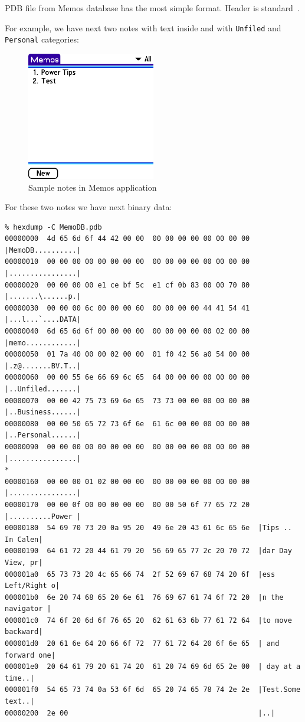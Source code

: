 \documentclass[a4paper,12pt,oneside]{scrartcl}
\begin{document}
PDB file from Memos database has the most simple format. Header is
standard~\cite{PalmFileFormatSpec}.

For example, we have next two notes with text inside and with \texttt{Unfiled}
and \texttt{Personal} categories:
\begin{figure}[H]
  \centering
  \includegraphics[width=0.5\textwidth]{memo.png}
  \caption{Sample notes in Memos application}
  \label{fig:sample-memos}
\end{figure}

For these two notes we have next binary data:

\footnotesize
\begin{verbatim}
% hexdump -C MemoDB.pdb
00000000  4d 65 6d 6f 44 42 00 00  00 00 00 00 00 00 00 00  |MemoDB..........|
00000010  00 00 00 00 00 00 00 00  00 00 00 00 00 00 00 00  |................|
00000020  00 00 00 00 e1 ce bf 5c  e1 cf 0b 83 00 00 70 80  |.......\......p.|
00000030  00 00 00 6c 00 00 00 60  00 00 00 00 44 41 54 41  |...l...`....DATA|
00000040  6d 65 6d 6f 00 00 00 00  00 00 00 00 00 02 00 00  |memo............|
00000050  01 7a 40 00 00 02 00 00  01 f0 42 56 a0 54 00 00  |.z@.......BV.T..|
00000060  00 00 55 6e 66 69 6c 65  64 00 00 00 00 00 00 00  |..Unfiled.......|
00000070  00 00 42 75 73 69 6e 65  73 73 00 00 00 00 00 00  |..Business......|
00000080  00 00 50 65 72 73 6f 6e  61 6c 00 00 00 00 00 00  |..Personal......|
00000090  00 00 00 00 00 00 00 00  00 00 00 00 00 00 00 00  |................|
*
00000160  00 00 00 01 02 00 00 00  00 00 00 00 00 00 00 00  |................|
00000170  00 00 0f 00 00 00 00 00  00 00 50 6f 77 65 72 20  |..........Power |
00000180  54 69 70 73 20 0a 95 20  49 6e 20 43 61 6c 65 6e  |Tips .. In Calen|
00000190  64 61 72 20 44 61 79 20  56 69 65 77 2c 20 70 72  |dar Day View, pr|
000001a0  65 73 73 20 4c 65 66 74  2f 52 69 67 68 74 20 6f  |ess Left/Right o|
000001b0  6e 20 74 68 65 20 6e 61  76 69 67 61 74 6f 72 20  |n the navigator |
000001c0  74 6f 20 6d 6f 76 65 20  62 61 63 6b 77 61 72 64  |to move backward|
000001d0  20 61 6e 64 20 66 6f 72  77 61 72 64 20 6f 6e 65  | and forward one|
000001e0  20 64 61 79 20 61 74 20  61 20 74 69 6d 65 2e 00  | day at a time..|
000001f0  54 65 73 74 0a 53 6f 6d  65 20 74 65 78 74 2e 2e  |Test.Some text..|
00000200  2e 00                                             |..|
\end{verbatim}
\normalsize
\end{document}
